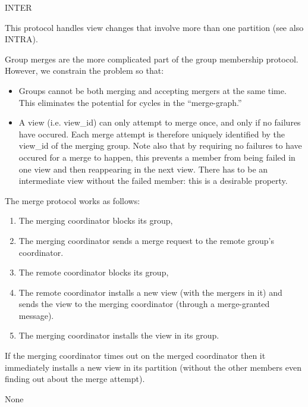 \begin{Layer}{INTER}

This protocol handles view changes that involve more than one
partition (see also INTRA).

\begin{Protocol}
Group merges are the more complicated part of the group membership
protocol.  However, we constrain the problem so that:
\begin{itemize}
\item
Groups cannot be both merging and accepting mergers at the same time.
This eliminates the potential for cycles in the ``merge-graph.''
\item
A view (i.e. view\_id) can only attempt to merge once, and only if no
failures have occured.  Each merge attempt is therefore uniquely
identified by the view\_id of the merging group.  Note also that by
requiring no failures to have occured for a merge to happen, this
prevents a member from being failed in one view and then reappearing
in the next view.  There has to be an intermediate view without the
failed member: this is a desirable property.
\end{itemize}
The merge protocol works as follows:
\begin{enumerate}
\item
The merging coordinator blocks its group,
\item
The merging coordinator sends a merge request to the remote group's
coordinator.
\item
The remote coordinator blocks its group,
\item
The remote coordinator installs a new view (with the mergers in it) and
sends the view to the merging coordinator (through a merge-granted
message).
\item
The merging coordinator installs the view in its group.
\end{enumerate}
If the merging coordinator times out on the merged coordinator then it
immediately installs a new view in its partition (without the other members
even finding out about the merge attempt).
\end{Protocol}

\begin{Parameters}
\item None
\end{Parameters}


\end{Layer}
